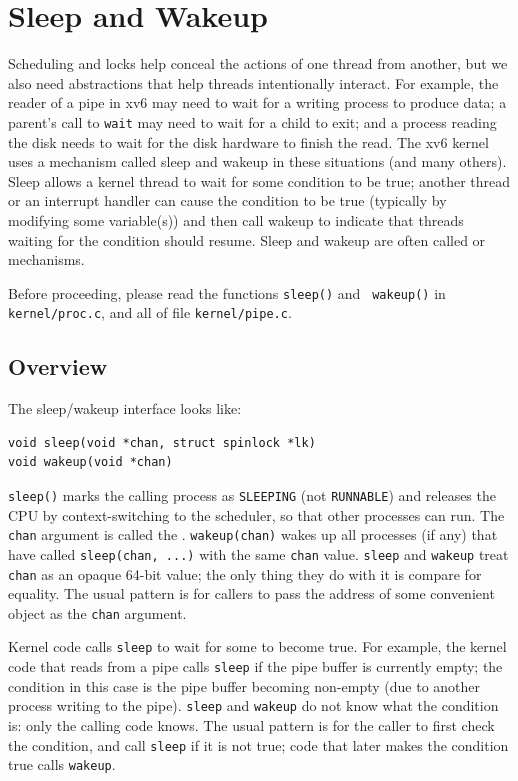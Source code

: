 \chapter{Sleep and Wakeup}
\label{CH:SLEEP}

Scheduling and locks help conceal the actions of one thread
from another,
but we also need abstractions that help
threads intentionally interact.
For example, the reader of a pipe in xv6 may need to wait
for a writing process to produce data;
a parent's call to \lstinline{wait} may need to
wait for a child to exit; and
a process reading the disk needs to wait
for the disk hardware to finish the read.
The xv6 kernel uses a mechanism called sleep and wakeup
in these situations (and many others).
Sleep allows a kernel thread to
wait for some condition to be true; another thread
or an interrupt handler can cause the condition
to be true (typically by modifying some variable(s))
and then call wakeup
to indicate that threads waiting for the condition should resume.
Sleep and wakeup are often called 
or 
mechanisms.

Before proceeding, please read the functions {\tt sleep()} and {\tt
  wakeup()} in {\tt kernel/proc.c}, and all of file {\tt kernel/pipe.c}.

\section{Overview}

The sleep/wakeup interface looks like:

\begin{lstlisting}
void sleep(void *chan, struct spinlock *lk)
void wakeup(void *chan)
\end{lstlisting}

\lstinline{sleep()} marks the calling process as \lstinline{SLEEPING}
(not \lstinline{RUNNABLE}) and releases the CPU by context-switching 
to the scheduler, so that other processes can run.
The \lstinline{chan} argument is called the .
\lstinline{wakeup(chan)} wakes up all processes (if any)
that have called \lstinline{sleep(chan, ...)} with the same \lstinline{chan}
value. \lstinline{sleep} and \lstinline{wakeup} treat \lstinline{chan}
as an opaque 64-bit value; the only thing they do with it is compare for
equality. The usual pattern is for callers to pass the address of
some convenient object as the \lstinline{chan} argument.

Kernel code calls \lstinline{sleep} to wait for some
 to become true. For example, the kernel code
that reads from a pipe calls \lstinline{sleep} if the pipe buffer is
currently empty; the condition in this case is the pipe buffer
becoming non-empty (due to another process writing to the pipe).
\lstinline{sleep} and \lstinline{wakeup} do not know what the
condition is: only the calling code knows. The usual pattern is for
the caller to first check the condition, and call \lstinline{sleep}
if it is not true; code that later makes the
condition true calls \lstinline{wakeup}.

